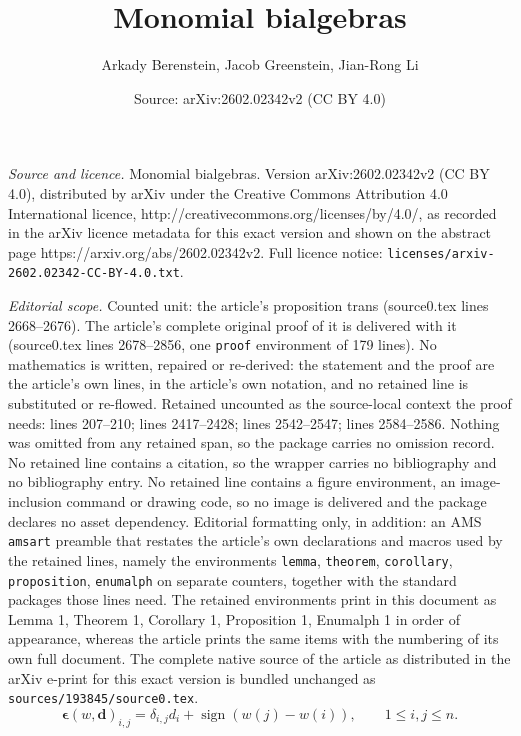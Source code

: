 \documentclass[10pt,a4paper]{amsart}
\title{Monomial bialgebras}
\author{Arkady Berenstein, Jacob Greenstein, Jian-Rong Li}
\date{Source: arXiv:2602.02342v2 (CC BY 4.0)}
\DeclareMathOperator{\sign}{sign}
\begin{document}
\maketitle

\noindent\emph{Source and licence.} Monomial bialgebras. Version arXiv:2602.02342v2 (CC BY 4.0), distributed by arXiv under the Creative Commons Attribution 4.0 International licence, http://creativecommons.org/licenses/by/4.0/, as recorded in the arXiv licence metadata for this exact version and shown on the abstract page https://arxiv.org/abs/2602.02342v2. Full licence notice: \texttt{licenses/arxiv-2602.02342-CC-BY-4.0.txt}.\par\smallskip

\noindent\textit{Editorial scope.} Counted unit: the article's proposition trans (source0.tex lines 2668--2676). The article's complete original proof of it is delivered with it (source0.tex lines 2678--2856, one \texttt{proof} environment of 179 lines). No mathematics is written, repaired or re-derived: the statement and the proof are the article's own lines, in the article's own notation, and no retained line is substituted or re-flowed.  Retained uncounted as the source-local context the proof needs: lines 207--210; lines 2417--2428; lines 2542--2547; lines 2584--2586.  Nothing was omitted from any retained span, so the package carries no omission record.  No retained line contains a citation, so the wrapper carries no bibliography and no bibliography entry.  No retained line contains a figure environment, an image-inclusion command or drawing code, so no image is delivered and the package declares no asset dependency.  Editorial formatting only, in addition: an AMS \texttt{amsart} preamble that restates the article's own declarations and macros used by the retained lines, namely the environments \texttt{lemma}, \texttt{theorem}, \texttt{corollary}, \texttt{proposition}, \texttt{enumalph} on separate counters, together with the standard packages those lines need.  The retained environments print in this document as Lemma 1, Theorem 1, Corollary 1, Proposition 1, Enumalph 1 in order of appearance, whereas the article prints the same items with the numbering of its own full document.  The complete native source of the article as distributed in the arXiv e-print for this exact version is bundled unchanged as \texttt{sources/193845/source0.tex}.
\begin{equation}\label{eq:eps w alpha defn}
\boldsymbol\epsilon(w,\boldsymbol d)_{i,j}=\delta_{i,j}d_i+\sign(w(j)-w(i)),
\qquad 1\le i,j\le n.
\end{equation}
\end{document}
